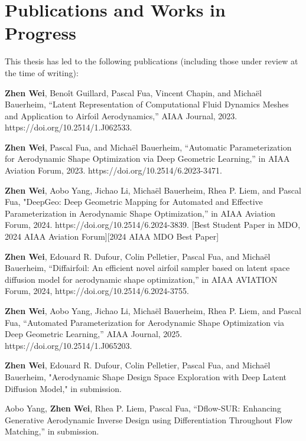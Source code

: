 \section{Publications and Works in Progress}
This thesis has led to the following publications (including those under review at the time of writing):

\textbf{Zhen Wei}, Benoît Guillard, Pascal Fua, Vincent Chapin, and Michaël Bauerheim, “Latent Representation of Computational Fluid Dynamics Meshes and Application to Airfoil Aerodynamics,” AIAA Journal, 2023. https://doi.org/10.2514/1.J062533.

\textbf{Zhen Wei}, Pascal Fua, and Michaël Bauerheim, “Automatic Parameterization for Aerodynamic Shape Optimization via Deep Geometric Learning,” in AIAA Aviation Forum, 2023. https://doi.org/10.2514/6.2023-3471.

\textbf{Zhen Wei}, Aobo Yang, Jichao Li, Michaël Bauerheim, Rhea P. Liem, and Pascal Fua, "DeepGeo: Deep Geometric Mapping for Automated and Effective Parameterization in Aerodynamic Shape Optimization,” in AIAA Aviation Forum, 2024. https://doi.org/10.2514/6.2024-3839. [Best Student Paper in MDO, 2024 AIAA Aviation Forum][2024 AIAA MDO Best Paper]

\textbf{Zhen Wei}, Edouard R. Dufour, Colin Pelletier, Pascal Fua, and Michaël Bauerheim, “Diffairfoil: An efficient novel airfoil sampler based on latent space diffusion model for aerodynamic shape optimization,” in AIAA AVIATION Forum, 2024, https://doi.org/10.2514/6.2024-3755.

\textbf{Zhen Wei}, Aobo Yang, Jichao Li, Michaël Bauerheim, Rhea P. Liem, and Pascal Fua, “Automated Parameterization for Aerodynamic Shape Optimization via Deep Geometric Learning,” AIAA Journal, 2025. https://doi.org/10.2514/1.J065203.

\textbf{Zhen Wei}, Edouard R. Dufour, Colin Pelletier, Pascal Fua, and Michaël Bauerheim, "Aerodynamic Shape Design Space Exploration with Deep Latent Diffusion Model," in submission.

Aobo Yang, \textbf{Zhen Wei}, Rhea P. Liem, Pascal Fua, “Dflow-SUR: Enhancing Generative Aerodynamic Inverse Design using Differentiation Throughout Flow Matching,” in submission.

